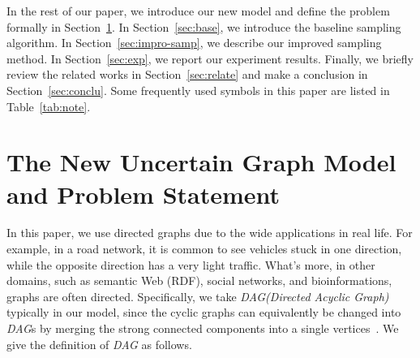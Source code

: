 \documentclass[runningheads,a4paper]{llncs}
\begin{document}
In the rest of our paper, we introduce our new model and define the problem formally in Section~\ref{sec:model-ProState}. In Section~\ref{sec:base}, we introduce the baseline sampling algorithm. In Section~\ref{sec:impro-samp}, we describe our improved sampling method. In Section~\ref{sec:exp}, we report our experiment results. Finally, we briefly review the related works in Section~\ref{sec:relate} and make a conclusion in Section~\ref{sec:conclu}. Some frequently used symbols in this paper are listed in Table~\ref{tab:note}.

\begin{table}[htbp]
\vspace{-0.5cm}
  \centering
  \caption{\small{Main Symbols}}
\vspace{-0.2cm}
  \label{tab:note}
\vspace{-1cm}
\end{table}


\section{The New Uncertain Graph Model and Problem Statement}
\label{sec:model-ProState}

\vspace{-0.3cm}
In this paper, we use directed graphs due to the wide applications in real life. For example, in a road network, it is common to see vehicles stuck in one direction, while the opposite direction has a very light traffic. What's more, in other domains, such as semantic Web (RDF), social networks, and bioinformations, graphs are often directed. Specifically, we take \emph{DAG(Directed Acyclic Graph)} typically in our model, since the cyclic graphs can equivalently be changed into \emph{DAG}s by merging the strong connected components into a single vertices~\cite{zhang2013efficient}. We give the definition of \emph{DAG} as follows.
\end{document}
